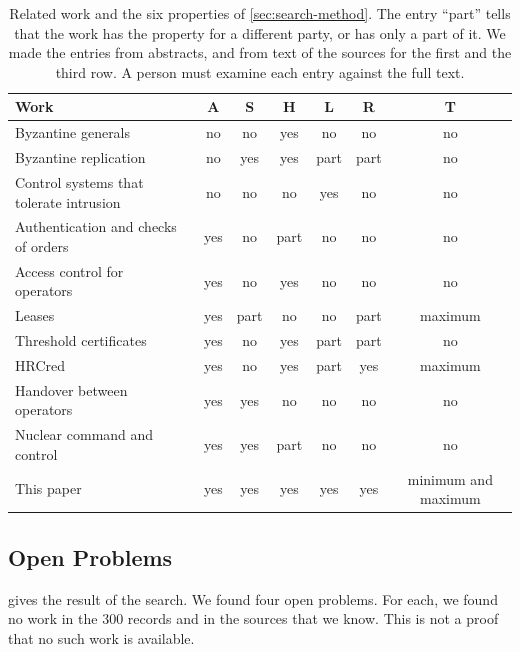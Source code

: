 \begin{table}[t]
\caption{Related work and the six properties of \cref{sec:search-method}. The entry ``part''
tells that the work has the property for a different party, or has only a part of it. We
made the entries from abstracts, and from text of the sources for the first and the third
row. A person must examine each entry against the full text.}
\label{tab:position}
\centering
\small
\begin{tabular}{@{}lcccccc@{}}
\toprule
Work & A & S & H & L & R & T \\
\midrule
Byzantine generals~\cite{lamport1982byzantine} & no & no & yes & no & no & no \\
Byzantine replication~\cite{castro1999pbft,castro2002pbft,amir2011prime} & no & yes & yes & part & part & no \\
Control systems that tolerate intrusion~\cite{babay2018spire,bommareddy2022realtime,bommareddy2024compound} & no & no & no & yes & no & no \\
Authentication and checks of orders~\cite{saxena2018signature,mashima2019delaying,hong2019resilient} & yes & no & part & no & no & no \\
Access control for operators~\cite{nasr2018operator,nasr2024authorization} & yes & no & yes & no & no & no \\
Leases~\cite{gray1989leases} & yes & part & no & no & part & maximum \\
Threshold certificates~\cite{zhou1999securing,luo2004ursa,liu2013ccrvc} & yes & no & yes & part & part & no \\
HRCred~\cite{zhou2026hrcred} & yes & no & yes & part & yes & maximum \\
Handover between operators~\cite{flemisch2012balance,grindley2024handover} & yes & yes & no & no & no & no \\
Nuclear command and control~\cite{feaver1992guarding,twigge1999learning} & yes & yes & part & no & no & no \\
\midrule
This paper & yes & yes & yes & yes & yes & minimum and maximum \\
\bottomrule
\end{tabular}
\end{table}

\subsection{Open Problems}
\label{sec:gaps}

 gives the result of the search. We found four open problems. For each,
we found no work in the 300 records and in the sources that we know. This is not a proof
that no such work is available.

